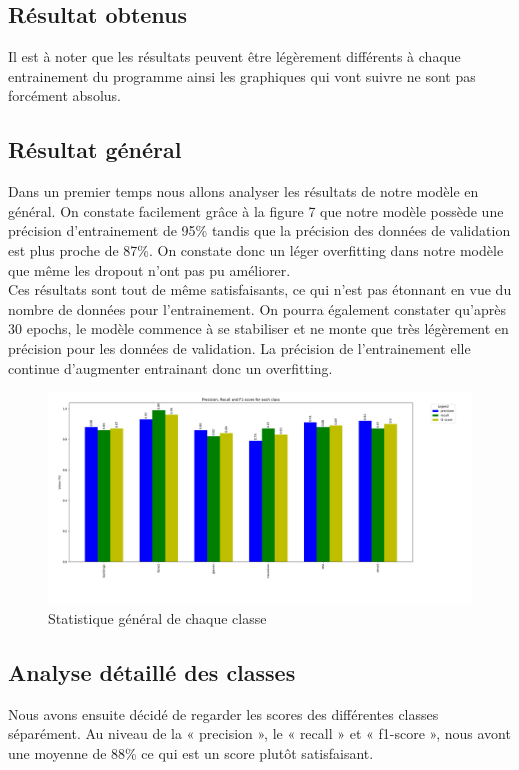 \documentclass[12pt ,a4paper ]{article}
\begin{document}
\begin{multicols}{2}
\section{Résultat obtenus}
Il est à noter que les résultats peuvent être légèrement différents à chaque entrainement du programme ainsi les graphiques qui vont suivre ne sont pas forcément absolus. 

\subsection{Résultat général}
Dans un premier temps nous allons analyser les résultats de notre modèle en général. 
On constate facilement grâce à la figure 7 que notre modèle possède une précision d'entrainement de 95\% tandis que la précision des données de validation est plus proche de 87\%. On constate donc un léger overfitting dans notre modèle que même les dropout n'ont pas pu améliorer. \\

Ces résultats sont tout de même satisfaisants, ce qui n'est pas étonnant en vue du nombre de données pour l'entrainement. On pourra également constater qu'après 30 epochs, le modèle commence à se stabiliser et ne monte que très légèrement en précision pour les données de validation. La précision de l'entrainement elle continue d'augmenter entrainant donc un overfitting.  


\begin{figure}[t]
    \begin{center}
        \includegraphics[scale=0.38]{./img/class_plot.png}
    \end{center}
    \caption{Statistique général de chaque classe}
\end{figure}
\newpage

\subsection{Analyse détaillé des classes}
Nous avons ensuite décidé de regarder les scores des différentes classes séparément. Au niveau de la « precision », le « recall » et « f1-score », nous avont une moyenne de 88\% ce qui est un score plutôt satisfaisant.\\


\end{multicols}
\end{document}
